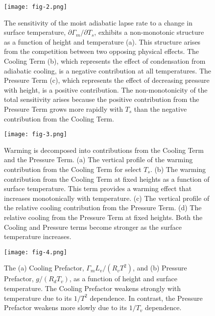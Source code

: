 \documentclass[draft]{ametsocV6.1}
\begin{document}
\begin{figure}[htbp]
 \centering
 \texttt{[image: fig-2.png]}\\
 \caption{The sensitivity of the moist adiabatic lapse rate to a change in surface temperature, $\partial\Gamma_m/\partial T_s$, exhibits a non-monotonic structure as a function of height and temperature (a). This structure arises from the competition between two opposing physical effects. The Cooling Term (b), which represents the effect of condensation from adiabatic cooling, is a negative contribution at all temperatures. The Pressure Term (c), which represents the effect of decreasing pressure with height, is a positive contribution. The non-monotonicity of the total sensitivity arises because the positive contribution from the Pressure Term grows more rapidly with $T_s$ than the negative contribution from the Cooling Term.}\label{fig:fig-2}
\end{figure}

\begin{figure}[htbp]
 \centering
 \texttt{[image: fig-3.png]}\\
 \caption{Warming is decomposed into contributions from the Cooling Term and the Pressure Term. (a) The vertical profile of the warming contribution from the Cooling Term for select $T_s$. (b) The warming contribution from the Cooling Term at fixed heights as a function of surface temperature. This term provides a warming effect that increases monotonically with temperature. (c) The vertical profile of the relative cooling contribution from the Pressure Term. (d) The relative cooling from the Pressure Term at fixed heights. Both the Cooling and Pressure terms become stronger as the surface temperature increases.}\label{fig:fig-3}
\end{figure}

\begin{figure}[htbp]
 \centering
 \texttt{[image: fig-4.png]}\\
 \caption{The (a) Cooling Prefactor, $\Gamma_m L_v / (R_v T^2)$, and (b) Pressure Prefactor, $g/(R_d T_v)$, as a function of height and surface temperature. The Cooling Prefactor weakens strongly with temperature due to its $1/T^2$ dependence. In contrast, the Pressure Prefactor weakens more slowly due to its $1/T_v$ dependence.}\label{fig:fig-4}
\end{figure}
\end{document}
